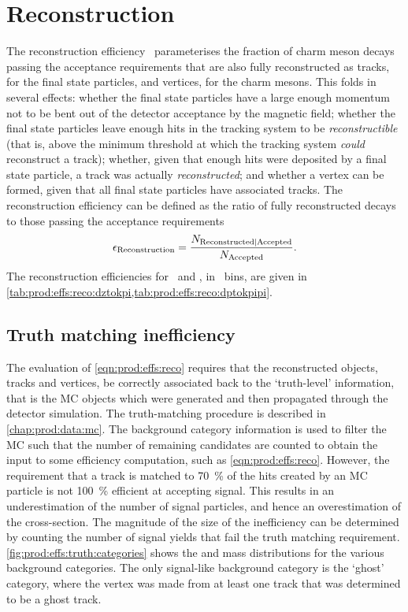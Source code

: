 \section{Reconstruction}
\label{chap:prod:effs:reco}

The reconstruction efficiency \effreco\ parameterises the fraction of charm meson decays passing the acceptance requirements that are also fully reconstructed as tracks, for the final state particles, and vertices, for the charm mesons.
This folds in several effects: whether the final state particles have a large enough momentum not to be bent out of the detector acceptance by the magnetic field; whether the final state particles leave enough hits in the tracking system to be \emph{reconstructible} (that is, above the minimum threshold at which the tracking system \emph{could} reconstruct a track); whether, given that enough hits were deposited by a final state particle, a track was actually \emph{reconstructed}; and whether a vertex can be formed, given that all final state particles have associated tracks.
The reconstruction efficiency can be defined as the ratio of fully reconstructed decays to those passing the acceptance requirements
\begin{equation}
  \effreco = \frac{%
    N_{\text{Reconstructed}|\text{Accepted}}
  }
  {%
    N_{\text{\text{Accepted}}}
  }.
  \label{eqn:prod:effs:reco}
\end{equation}
The reconstruction efficiencies for \DzToKpi\ and \DpToKpipi, in \pTy\ bins, are 
given in \cref{tab:prod:effs:reco:dztokpi,tab:prod:effs:reco:dptokpipi}.

\subsection{Truth matching inefficiency}
\label{chap:prod:effs:truth}

The evaluation of \cref{eqn:prod:effs:reco} requires that the reconstructed objects, tracks and vertices, be correctly associated back to the `truth-level' information, that is the \ac{MC} objects which were generated and then propagated through the detector simulation.
The truth-matching procedure is described in \cref{chap:prod:data:mc}.
The background category information is used to filter the \ac{MC} such that the 
number of remaining candidates are counted to obtain the input to some 
efficiency computation, such as \cref{eqn:prod:effs:reco}.
However, the requirement that a track is matched to \SI{70}{\percent} of the hits created by an \ac{MC} particle is not \SI{100}{\percent} efficient at accepting signal.
This results in an underestimation of the number of signal particles, and hence an overestimation of the cross-section.
The magnitude of the size of the inefficiency can be determined by counting the 
number of signal yields that fail the truth matching requirement.
\cref{fig:prod:effs:truth:categories} shows the \PDzero and \PDplus mass 
distributions for the various background categories.
The only signal-like background category is the `ghost' category,
where the vertex was made from at least one track that was determined to be a ghost track.

